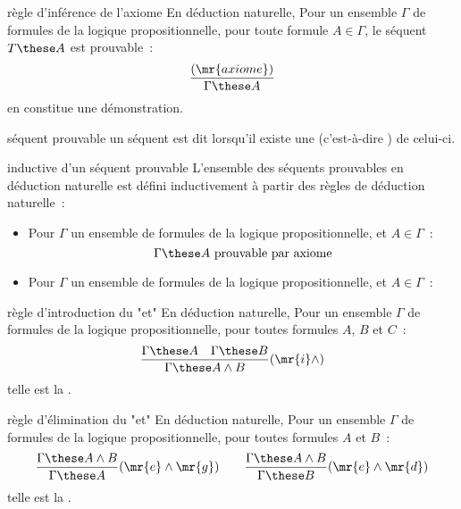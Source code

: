 \begin{adjustwidth}{-3cm}{-3cm}
\begin{definition}{7.5}{règle d'inférence de l'axiome}
    En déduction naturelle, Pour un ensemble $\Gamma$ de formules de la logique propositionnelle, pour toute formule $A \in \Gamma$, le séquent $T \these A$ est prouvable~:
    $$\frac{(\mr{axiome})}{\Gamma \these A}$$
    en constitue une démonstration.
\end{definition}

\begin{definition}{7.6}{séquent prouvable}
    un séquent est dit  lorsqu'il existe une  (c'est-à-dire ) de celui-ci.
\end{definition}

\begin{definition}{7.7}{inductive d'un séquent prouvable}
    L'ensemble des séquents prouvables en déduction naturelle est défini inductivement à partir des règles de déduction naturelle~:
    \begin{itemize}
        \item Pour $\Gamma$ un ensemble de formules de la logique propositionnelle, et $A \in \Gamma$~:
        $$\Gamma \these A \text{ prouvable par axiome}$$
        \item Pour $\Gamma$ un ensemble de formules de la logique propositionnelle, et $A \in \Gamma$~:

    \end{itemize}
\end{definition}

\begin{definition}{7.8}{règle d'introduction du "et"}
    En déduction naturelle, Pour un ensemble $\Gamma$ de formules de la logique propositionnelle, pour toutes formules $A$, $B$ et $C$~:
    $$\frac{\Gamma \these A \quad \Gamma \these B}{\Gamma \these A \wedge B}(\mr{i}\wedge)$$
    telle est la .
\end{definition}

\begin{definition}{7.9}{règle d'élimination du "et"}
    En déduction naturelle, Pour un ensemble $\Gamma$ de formules de la logique propositionnelle, pour toutes formules $A$ et $B$~:
    $$\frac{\Gamma \these A \wedge B}{\Gamma \these A}(\mr{e}\wedge\mr{g}) \qquad \frac{\Gamma \these A \wedge B}{\Gamma \these B}(\mr{e}\wedge\mr{d})$$
    telle est la .
\end{definition}


\end{adjustwidth}
